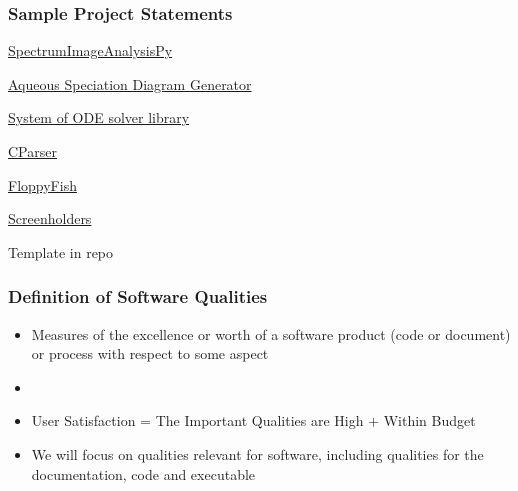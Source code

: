 \documentclass[t,12pt,numbers,fleqn]{beamer}
\begin{document}
\begin{frame}
\frametitle{Sample Project Statements} 

\bi
\item
  \href{https://github.com/icbicket/SpectrumImageAnalysisPy/blob/master/Doc/ProblemStatement/ProblemStatement.tex}
  {SpectrumImageAnalysisPy}
\item
  \href{https://github.com/palmerst/cas741_sp/blob/master/Doc/ProblemStatement/ProblemStatement.pdf}{Aqueous
    Speciation Diagram Generator}
\item
  \href{https://github.com/aoananp/cas741/blob/master/Doc/ProblemStatement/ProblemStatement.pdf}{System
    of ODE solver library}
\item \href{https://gitlab.cas.mcmaster.ca/ThisTooShallParse/3XA3_CParser}{CParser}
\item \href{https://gitlab.cas.mcmaster.ca/theateam/FloppyFishGroup}{FloppyFish}
\item
  \href{https://gitlab.cas.mcmaster.ca/screenholders/screenholders}{Screenholders}
\item Template in repo
\ei

\end{frame}


\begin{frame}
\frametitle{Definition of Software Qualities}

\begin{itemize}
\item Measures of the excellence or worth of a software product (code or document) or process
with respect to some aspect
\item {}
\item User Satisfaction = The Important Qualities are High + Within Budget
  \item We will focus on qualities relevant for software, including qualities
    for the documentation, code and executable
\end{itemize}
\end{frame}

\end{document}
